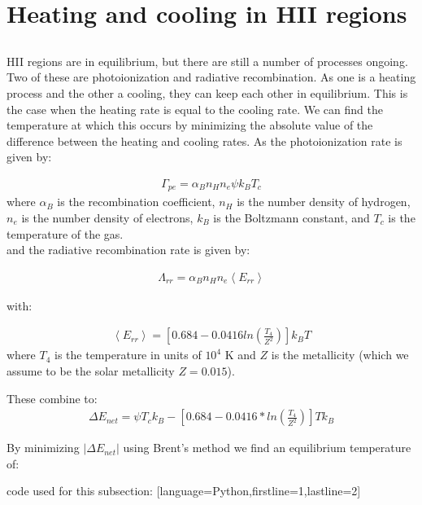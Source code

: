 \section{Heating and cooling in HII regions}

\subsection{}
HII regions are in equilibrium, but there are still a number of processes ongoing.
Two of these are photoionization and radiative recombination.
As one is a heating process and the other a cooling, they can keep each other in equilibrium.
This is the case when the heating rate is equal to the cooling rate.
We can find the temperature at which this occurs by minimizing the absolute value of the difference between the heating and cooling rates.
As the photoionization rate is given by:

\begin{align}
    \Gamma_{pe} = \alpha_B n_H n_e \psi k_B T_c
\end{align}
where $\alpha_B$ is the recombination coefficient, $n_H$ is the number density of hydrogen, $n_e$ is the number density of electrons, 
$k_B$ is the Boltzmann constant, and $T_c$ is the temperature of the gas.
\\
and the radiative recombination rate is given by:

\begin{align}
    \Lambda_{rr} = \alpha_B n_H n_e \left< E_{rr} \right>
\end{align}

with:

\begin{align}
    \left< E_{rr} \right> = \left[ 0.684 - 0.0416 ln\left( \frac{T_4}{Z^2} \right) \right] k_B T
\end{align}
where $T_4$ is the temperature in units of $10^4$ K and $Z$ is the metallicity (which we assume to be the solar metallicity $Z=0.015$).

These combine to:
\begin{align}
    \Delta E_{net} = \psi T_c k_B - \left[ 0.684 - 0.0416 * ln\left( \frac{T_4}{Z^2} \right) \right] T k_B
\end{align}

By minimizing $| \Delta E_{net} |$ using Brent's method we find an equilibrium temperature of:


code used for this subsection:
[language=Python,firstline=1,lastline=2]

